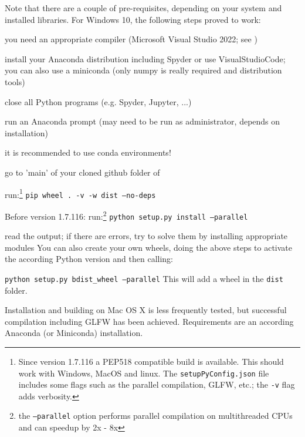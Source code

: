 
Note that there are a couple of pre-requisites, depending on your system and installed libraries. For Windows 10, the following steps proved to work:
\bi
  \item you need an appropriate compiler (Microsoft Visual Studio 2022; see )
  \item install your Anaconda distribution including Spyder or use VisualStudioCode; you can also use a miniconda (only numpy is really required and distribution tools)
  \item close all Python programs (e.g. Spyder, Jupyter, ...) 
  \item run an Anaconda prompt (may need to be run as administrator, depends on installation)
  \item it is recommended to use conda environments!
  \item go to 'main' of your cloned github folder of \codeName 
  \item run:\footnote{Since version 1.7.116 a PEP518 compatible build is available. This should work with Windows, MacOS and linux. The \texttt{setupPyConfig.json} file includes some flags such as the parallel compilation, GLFW, etc.; the \texttt{-v} flag adds verbosity.} \texttt{pip wheel . -v -w dist --no-deps}
  \item Before version 1.7.116: run:\footnote{the \texttt{--parallel} option performs parallel compilation on multithreaded CPUs and can speedup by 2x - 8x} \texttt{python setup.py install --parallel}
  \item read the output; if there are errors, try to solve them by installing appropriate modules
\ei
You can also create your own wheels, doing the above steps to activate the according Python version and then calling:
\bi
  \item[] \texttt{python setup.py bdist\_wheel --parallel}
\ei
This will add a wheel in the \texttt{dist} folder.

Installation and building on Mac OS X is less frequently tested, but successful compilation including GLFW has been achieved.
Requirements are an according Anaconda (or Miniconda) installation.

